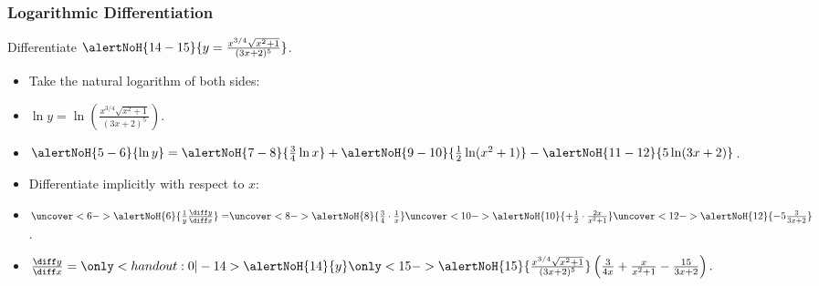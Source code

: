 \begin{frame}
\frametitle{Logarithmic Differentiation}
\begin{example}[Example 7, p. 223]
Differentiate $\alertNoH{ 14-15}{y = \frac{x^{3/4}\sqrt{x^2 + 1}}{(3x+2)^5}}$.
\begin{itemize}
\item<2->  Take the natural logarithm of both sides:
\item<2->  $\ln y = \ln \left( \frac{x^{3/4}\sqrt{x^2+1}}{(3x+2)^5}\right)$.
\item<3->  $\alertNoH{ 5-6}{\ln y} = \alertNoH{ 7-8}{\frac{3}{4} \ln x} + \alertNoH{ 9-10}{\frac{1}{2} \ln (x^2 + 1)} - \alertNoH{ 11-12}{5\ln (3x+2)}$.
\item<4->  Differentiate implicitly with respect to $x$:
\item<5->  $\uncover<6->{\alertNoH{ 6}{\frac{1}{y} \frac{\diff y}{\diff x}} =} \uncover<8->{\alertNoH{ 8}{\frac{3}{4}\cdot \frac{1}{x}}} \uncover<10->{\alertNoH{ 10}{+ \frac{1}{2} \cdot \frac{2x}{x^2+1}}} \uncover<12->{\alertNoH{ 12}{- 5\frac{3}{3x+2}}}$.
\item<13->  $\frac{\diff y}{\diff x} = \only<handout:0| -14>{\alertNoH{ 14}{y}}\only<15->{\alertNoH{ 15}{\frac{x^{3/4}\sqrt{x^2+1}}{(3x+2)^5}}}\left( \frac{3}{4x} + \frac{x}{x^2+1} - \frac{15}{3x+2}\right) .$
\end{itemize}
\end{example}
\end{frame}
